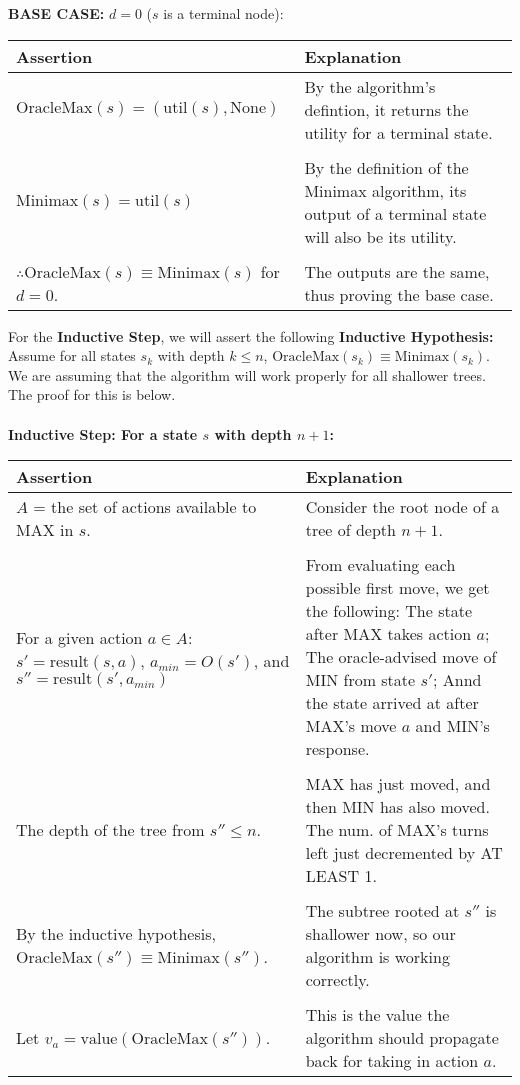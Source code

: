 \documentclass[11pt]{article}
\newenvironment{answercols}
  {\begin{center}\begin{tabular}{p{0.45\textwidth}p{0.45\textwidth}}
   \toprule
   \textbf{Assertion} & \textbf{Explanation} \\
   \midrule}
  {\\ \bottomrule\end{tabular}\end{center}}
\begin{document}
    \newpage

    \textbf{BASE CASE: } $d = 0$ ($s$ is a terminal node):
    \begin{answercols}
        $\text{OracleMax}(s) = (\text{util}(s), \text{None})$ &
        By the algorithm's defintion, it returns the utility for a terminal state. \\
        \\
        $\text{Minimax}(s) = \text{util}(s)$ &
        By the definition of the Minimax algorithm, its output of a terminal state will also be its utility. \\
        \\
        $\therefore \text{OracleMax}(s) \equiv \text{Minimax}(s)$ for $d = 0$. &
        The outputs are the same, thus proving the base case.
    \end{answercols}

    \noindent For the \textbf{Inductive Step}, we will assert the following \textbf{Inductive Hypothesis:} \\
    Assume for all states $s_k$ with depth $k \le n$, $\text{OracleMax}(s_k) \equiv \text{Minimax}(s_k)$. \\
    We are assuming that the algorithm will work properly for all shallower trees. The proof for this is below. \\
    \\
    \noindent \textbf{Inductive Step: For a state $s$ with depth $n + 1$:} \\
    \begin{answercols}
        $A$ = the set of actions available to MAX in $s$. & 
        Consider the root node of a tree of depth $n + 1$. \\
        \\
        For a given action $a \in A$:
        $s' = \text{result}(s, a)$,
        $a_{min} = O(s')$, and
        $s'' = \text{result}(s', a_{min})$ &
        From evaluating each possible first move, we get the following: The state after MAX takes action $a$; The oracle-advised move of MIN from state $s'$; Annd the state arrived at after MAX's move $a$ and MIN's response. \\
        \\
        The depth of the tree from $s'' \le n$. &
        MAX has just moved, and then MIN has also moved. The num. of MAX's turns left just decremented by AT LEAST 1. \\
        \\
        By the inductive hypothesis, $\text{OracleMax}(s'') \equiv \text{Minimax}(s'')$. &
        The subtree rooted at $s''$ is shallower now, so our algorithm is working correctly. \\
        \\
        Let $v_a = \text{value}(\text{OracleMax}(s''))$. &
        This is the value the algorithm should propagate back for taking in action $a$.
    \end{answercols}
\end{document}
